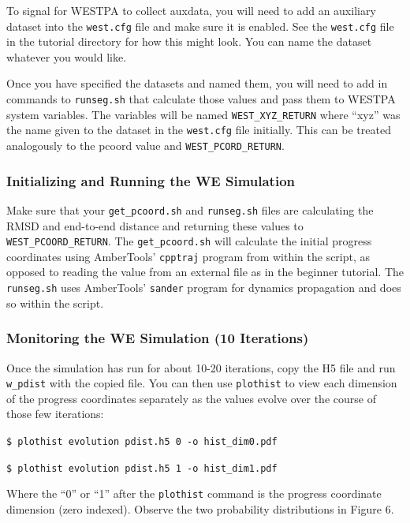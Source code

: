 \documentclass[9pt,tutorial,ASAPversion]{livecoms}
\begin{document}
To signal for WESTPA to collect auxdata, you will need to add an auxiliary dataset into the \verb|west.cfg| file and make sure it is enabled. 
See the \verb|west.cfg| file in the tutorial directory for how this might look. 
You can name the dataset whatever you would like. 

Once you have specified the datasets and named them, you will need to add in commands to \verb|runseg.sh| that calculate those values and pass them to WESTPA system variables. 
The variables will be named \verb|WEST_XYZ_RETURN| where “xyz” was the name given to the dataset in the \verb|west.cfg| file initially. 
This can be treated analogously to the pcoord value and \verb|WEST_PCORD_RETURN|.

\subsubsection{Initializing and Running the WE Simulation}

Make sure that your \verb|get_pcoord.sh| and \verb|runseg.sh| files are calculating the RMSD and end-to-end distance and returning these values to \verb|WEST_PCOORD_RETURN|. 
The \verb|get_pcoord.sh| will calculate the initial progress coordinates using AmberTools’ \verb|cpptraj| program from within the script, as opposed to reading the value from an external file as in the beginner tutorial.
The \verb|runseg.sh| uses AmberTools’ \verb|sander| program for dynamics propagation and does so within the script.

\subsubsection{Monitoring the WE Simulation (10 Iterations)}

Once the simulation has run for about 10-20 iterations, copy the H5 file and run \verb|w_pdist| with the copied file. 
You can then use \verb|plothist| to view each dimension of the progress coordinates separately as the values evolve over the course of those few iterations:

\verb|$ plothist evolution pdist.h5 0 -o hist_dim0.pdf|

\verb|$ plothist evolution pdist.h5 1 -o hist_dim1.pdf|

Where the “0” or “1” after the \verb|plothist| command is the progress coordinate dimension (zero indexed). 
Observe the two probability distributions in Figure 6.
\end{document}
